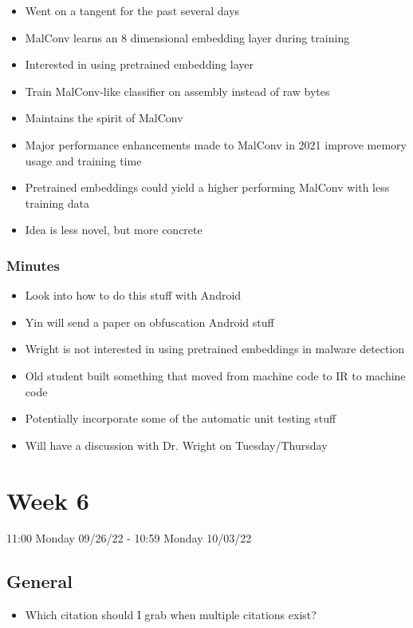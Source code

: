 \documentclass{article}
\begin{document}
\begin{itemize}
\begin{itemize}
		\item Went on a tangent for the past several days
		\item MalConv learns an 8 dimensional embedding layer during training
		\item Interested in using pretrained embedding layer
		\item Train MalConv-like classifier on assembly instead of raw bytes
		\item Maintains the spirit of MalConv
		\item Major performance enhancements made to MalConv in 2021 improve memory usage and training time
		\item Pretrained embeddings could yield a higher performing MalConv with less training data
		\item Idea is less novel, but more concrete
	\end{itemize}
\end{itemize}
\subsubsection*{Minutes}
\begin{itemize}
	\item Look into how to do this stuff with Android
	\item Yin will send a paper on obfuscation Android stuff
	\item Wright is not interested in using pretrained embeddings in malware detection
	\item Old student built something that moved from machine code to IR to machine code
	\item Potentially incorporate some of the automatic unit testing stuff
	\item Will have a discussion with Dr. Wright on Tuesday/Thursday
\end{itemize}

\pagebreak


\section*{Week 6}
11:00 Monday 09/26/22 - 10:59 Monday 10/03/22

\subsection*{General}
\begin{itemize}
	\item Which citation should I grab when multiple citations exist?
\end{itemize}
\end{document}
